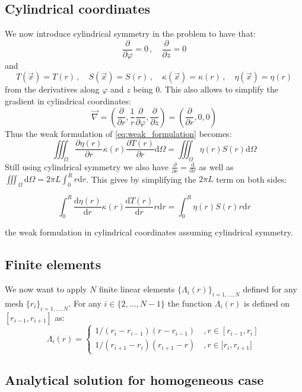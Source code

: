 \subsection{Cylindrical coordinates}
We now introduce cylindrical symmetry in the problem to have that:
\begin{equation}
    \frac{\partial}{\partial \varphi} = 0 \, ,\quad \frac{\partial}{\partial z} = 0
\end{equation}
and
\begin{equation}
    T(\vec{x}) = T(r) \, , \quad S(\vec{x}) = S(r) \, , \quad \kappa(\vec{x}) = \kappa(r) \, , \quad \eta(\vec{x}) = \eta(r)
\end{equation}
from the derivatives along $\varphi$ and $z$ being 0. This also allows to simplify the gradient in cylindrical coordinates:
\begin{equation}
    \vec{\nabla} = \left(\frac{\partial}{\partial r}, \frac{1}{r}\frac{\partial}{\partial \varphi}, \frac{\partial}{\partial z}\right) = \left(\frac{\partial}{\partial r}, 0, 0\right)
\end{equation}
Thus the weak formulation of \autoref{eq:weak_formulation} becomes:
\begin{equation}
    \iiint_\Omega \frac{\partial \eta (r)}{\partial r} \kappa(r) \frac{\partial T(r)}{\partial r} \mathrm{d}\Omega = \iiint_\Omega \eta(r)S(r) \mathrm{d}\Omega
\end{equation}
Still using cylindrical symmetry we also have $\frac{\partial}{\partial r} = \frac{\mathrm{d}}{\mathrm{d}r}$ as well as $\iiint_\Omega \mathrm{d}\Omega = 2\pi L \int_0^R r \mathrm{d}r$. This gives by simplifying the $2\pi L$ term on both sides:

\begin{equation}
    \int_0^R \frac{\mathrm{d} \eta (r)}{\mathrm{d} r} \kappa(r) \frac{\mathrm{d} T(r)}{\mathrm{d} r} r \mathrm{d}r = \int_0^R \eta(r)S(r) r \mathrm{d}r
\end{equation}

the weak formulation in cylindrical coordinates assuming cylindrical symmetry.

\subsection{Finite elements}
We now want to apply $N$ finite linear elements $\{\Lambda_i(r)\}_{i=1,\ldots,N}$ defined for any mesh $\{r_i\}_{i=1,\ldots,N}$. For any $i \in \{2,\ldots,N-1\}$ the function $\Lambda_i(r)$ is defined on $[r_{i-1}, r_{i+1}]$ as:
\begin{equation}
    \Lambda_i(r) = \begin{cases}
        1/(r_i - r_{i-1})(r - r_{i-1}) \quad , r\in[r_{i-1}, r_i] \\
        1/(r_{i+1} - r_i)(r_{i+1} - r) \quad , r\in]r_i, r_{i+1}]
    \end{cases}
\end{equation}


\subsection{Analytical solution for homogeneous case}
\label{sec:solution_anal}
